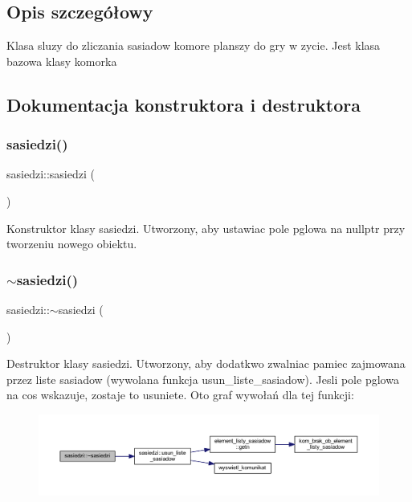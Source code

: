 \subsection{Opis szczegółowy}
Klasa sluzy do zliczania sasiadow komore planszy do gry w zycie. Jest klasa bazowa klasy komorka 

\subsection{Dokumentacja konstruktora i destruktora}
\mbox{\label{classsasiedzi_ac74c7627b37fab5063203ec1d1a1d0f8}} 
\subsubsection{\texorpdfstring{sasiedzi()}{sasiedzi()}}
{\footnotesize\ttfamily sasiedzi\+::sasiedzi (\begin{DoxyParamCaption}{ }\end{DoxyParamCaption})}

Konstruktor klasy sasiedzi. Utworzony, aby ustawiac pole pglowa na nullptr przy tworzeniu nowego obiektu. \mbox{\label{classsasiedzi_a37e4c37e8d5aa38f1f18dee6b3a876e8}} 
\subsubsection{\texorpdfstring{$\sim$sasiedzi()}{~sasiedzi()}}
{\footnotesize\ttfamily sasiedzi\+::$\sim$sasiedzi (\begin{DoxyParamCaption}{ }\end{DoxyParamCaption})}

Destruktor klasy sasiedzi. Utworzony, aby dodatkwo zwalniac pamiec zajmowana przez liste sasiadow (wywolana funkcja usun\+\_\+liste\+\_\+sasiadow). Jesli pole pglowa na cos wskazuje, zostaje to usuniete. Oto graf wywołań dla tej funkcji\+:
\nopagebreak
\begin{figure}[H]
\begin{center}
\leavevmode
\includegraphics[width=350pt]{classsasiedzi_a37e4c37e8d5aa38f1f18dee6b3a876e8_cgraph}
\end{center}
\end{figure}


